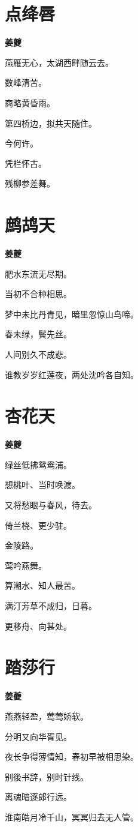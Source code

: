 \documentclass[12pt,a4paper]{ctexbook}
\begin{document}
\section{点绛唇}
\textbf{姜夔}\par\vspace{0.5em}
燕雁无心，太湖西畔随云去。\par
数峰清苦。\par
商略黄昏雨。\par
第四桥边，拟共天随住。\par
今何许。\par
凭栏怀古。\par
残柳参差舞。\par

\section{鹧鸪天}
\textbf{姜夔}\par\vspace{0.5em}
肥水东流无尽期。\par
当初不合种相思。\par
梦中未比丹青见，暗里忽惊山鸟啼。\par
春未绿，鬓先丝。\par
人间别久不成悲。\par
谁教岁岁红莲夜，两处沈吟各自知。\par

\section{杏花天}
\textbf{姜夔}\par\vspace{0.5em}
绿丝低拂鸳鸯浦。\par
想桃叶、当时唤渡。\par
又将愁眼与春风，待去。\par
倚兰桡、更少驻。\par
金陵路。\par
莺吟燕舞。\par
算潮水、知人最苦。\par
满汀芳草不成归，日暮。\par
更移舟、向甚处。\par

\section{踏莎行}
\textbf{姜夔}\par\vspace{0.5em}
燕燕轻盈，莺莺娇软。\par
分明又向华胥见。\par
夜长争得薄情知，春初早被相思染。\par
别後书辞，别时针线。\par
离魂暗逐郎行远。\par
淮南皓月冷千山，冥冥归去无人管。\par
\end{document}
